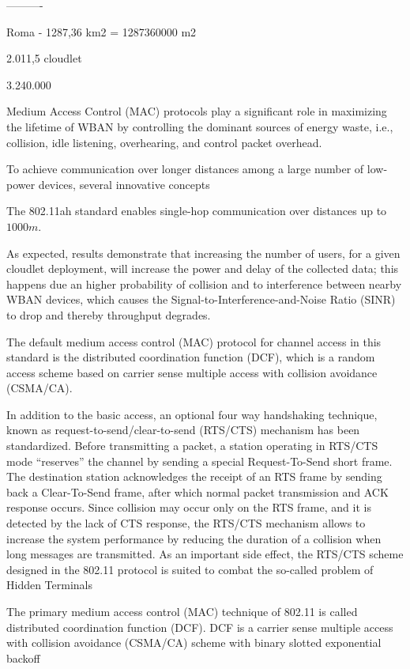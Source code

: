 \documentclass[sigchi]{acmart}
\begin{document}
----------

Roma - 1287,36 km2 = 1287360000 m2

2.011,5 cloudlet  


3.240.000




Medium Access
Control (MAC) protocols play a signiﬁcant role in maximizing
the lifetime of WBAN by controlling the dominant sources
of energy waste, i.e., collision, idle listening, overhearing,
and control packet overhead.

To achieve communication over longer distances among a large number of low-power devices, several innovative concepts 

The 802.11ah standard enables single-hop communication over distances up to $1000 m$.


As expected, \citet{MSAReport} results demonstrate that increasing the number of users, for a given cloudlet deployment, will increase the power and delay of the collected data; this happens due an higher probability of collision and to interference between nearby WBAN devices, which causes the Signal-to-Interference-and-Noise Ratio (SINR) to drop and thereby throughput degrades.


 The
default medium access control (MAC) protocol for channel access in this standard is the distributed coordination
function (DCF), which is a random access scheme based
on carrier sense multiple access with collision avoidance
(CSMA/CA).

In addition to the basic access, an optional four way handshaking technique, known as request-to-send/clear-to-send
(RTS/CTS) mechanism has been standardized. Before transmitting a packet, a station operating in RTS/CTS mode “reserves”
the channel by sending a special Request-To-Send short frame.
The destination station acknowledges the receipt of an RTS
frame by sending back a Clear-To-Send frame, after which
normal packet transmission and ACK response occurs. Since
collision may occur only on the RTS frame, and it is detected
by the lack of CTS response, the RTS/CTS mechanism allows
to increase the system performance by reducing the duration
of a collision when long messages are transmitted. As an
important side effect, the RTS/CTS scheme designed in the
802.11 protocol is suited to combat the so-called problem of
Hidden Terminals


 The primary medium access control (MAC) technique of 802.11 is called distributed coordination function (DCF). DCF is a carrier sense multiple access
with collision avoidance (CSMA/CA) scheme with binary slotted
exponential backoff
\end{document}
